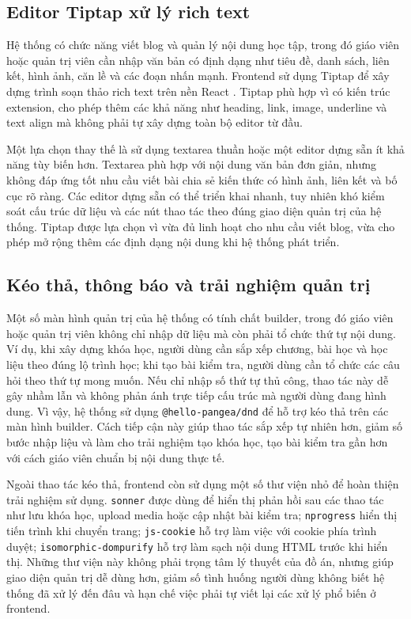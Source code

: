 \documentclass[../DoAn.tex]{subfiles}
\begin{document}
\subsection{Editor Tiptap xử lý rich text}
\label{subsection:3.2.6}

Hệ thống có chức năng viết blog và quản lý nội dung học tập, trong đó giáo viên hoặc quản trị viên cần nhập văn bản có định dạng như tiêu đề, danh sách, liên kết, hình ảnh, căn lề và các đoạn nhấn mạnh. Frontend sử dụng Tiptap để xây dựng trình soạn thảo rich text trên nền React \cite{tiptap_docs}. Tiptap phù hợp vì có kiến trúc extension, cho phép thêm các khả năng như heading, link, image, underline và text align mà không phải tự xây dựng toàn bộ editor từ đầu.

Một lựa chọn thay thế là sử dụng textarea thuần hoặc một editor dựng sẵn ít khả năng tùy biến hơn. Textarea phù hợp với nội dung văn bản đơn giản, nhưng không đáp ứng tốt nhu cầu viết bài chia sẻ kiến thức có hình ảnh, liên kết và bố cục rõ ràng. Các editor dựng sẵn có thể triển khai nhanh, tuy nhiên khó kiểm soát cấu trúc dữ liệu và các nút thao tác theo đúng giao diện quản trị của hệ thống. Tiptap được lựa chọn vì vừa đủ linh hoạt cho nhu cầu viết blog, vừa cho phép mở rộng thêm các định dạng nội dung khi hệ thống phát triển.

\subsection{Kéo thả, thông báo và trải nghiệm quản trị}
\label{subsection:3.2.7}

Một số màn hình quản trị của hệ thống có tính chất builder, trong đó giáo viên hoặc quản trị viên không chỉ nhập dữ liệu mà còn phải tổ chức thứ tự nội dung. Ví dụ, khi xây dựng khóa học, người dùng cần sắp xếp chương, bài học và học liệu theo đúng lộ trình học; khi tạo bài kiểm tra, người dùng cần tổ chức các câu hỏi theo thứ tự mong muốn. Nếu chỉ nhập số thứ tự thủ công, thao tác này dễ gây nhầm lẫn và không phản ánh trực tiếp cấu trúc mà người dùng đang hình dung. Vì vậy, hệ thống sử dụng \texttt{@hello-pangea/dnd} để hỗ trợ kéo thả trên các màn hình builder. Cách tiếp cận này giúp thao tác sắp xếp tự nhiên hơn, giảm số bước nhập liệu và làm cho trải nghiệm tạo khóa học, tạo bài kiểm tra gần hơn với cách giáo viên chuẩn bị nội dung thực tế.

Ngoài thao tác kéo thả, frontend còn sử dụng một số thư viện nhỏ để hoàn thiện trải nghiệm sử dụng. \texttt{sonner} được dùng để hiển thị phản hồi sau các thao tác như lưu khóa học, upload media hoặc cập nhật bài kiểm tra; \texttt{nprogress} hiển thị tiến trình khi chuyển trang; \texttt{js-cookie} hỗ trợ làm việc với cookie phía trình duyệt; \texttt{isomorphic-dompurify} hỗ trợ làm sạch nội dung HTML trước khi hiển thị. Những thư viện này không phải trọng tâm lý thuyết của đồ án, nhưng giúp giao diện quản trị dễ dùng hơn, giảm số tình huống người dùng không biết hệ thống đã xử lý đến đâu và hạn chế việc phải tự viết lại các xử lý phổ biến ở frontend.
\end{document}
